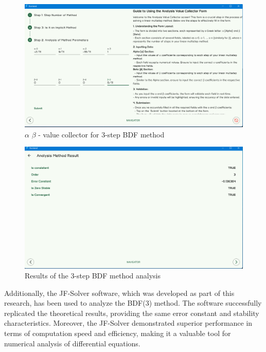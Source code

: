 \begin{figure}[htbp]
    \centering
    \includegraphics[width=1\textwidth]{chapters/4/image/5.png}
    \caption{$\alpha$ $\beta$ - value collector for 3-step BDF method}
\end{figure}

\begin{figure}[htbp]
    \centering
    \includegraphics[width=1\textwidth]{chapters/4/image/6.png}
    \caption{Results of the 3-step BDF method analysis}
\end{figure}



Additionally, the JF-Solver software, which was developed as part of this research, has been used to analyze the BDF(3) method. The software successfully replicated the theoretical results, providing the same error constant and stability characteristics. Moreover, the JF-Solver demonstrated superior performance in terms of computation speed and efficiency, making it a valuable tool for numerical analysis of differential equations.



